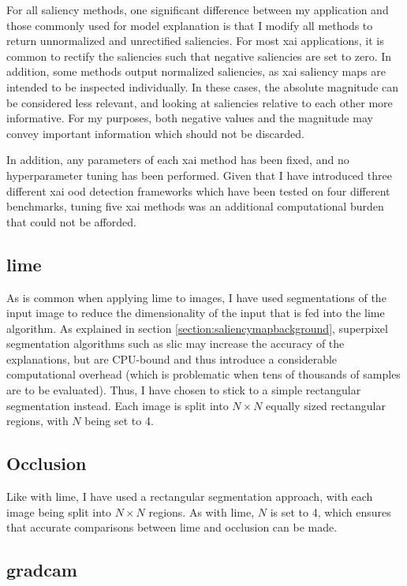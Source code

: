 \documentclass[UKenglish]{uiomasterthesis} %
\theoremstyle{definition}
\begin{document}
For all saliency methods, one significant difference between my application and those commonly used for model explanation is that I modify all methods to return unnormalized and unrectified saliencies. For most \ac{xai} applications, it is common to rectify the saliencies such that negative saliencies are set to zero. In addition, some methods output normalized saliencies, as \ac{xai} saliency maps are intended to be inspected individually. In these cases, the absolute magnitude can be considered less relevant, and looking at saliencies relative to each other more informative. For my purposes, both negative values and the magnitude may convey important information which should not be discarded.

In addition, any parameters of each \ac{xai} method has been fixed, and no hyperparameter tuning has been performed. Given that I have introduced three different \ac{xai} \ac{ood} detection frameworks which have been tested on four different benchmarks, tuning five \ac{xai} methods was an additional computational burden that could not be afforded.

\subsection{\ac{lime}}

As is common when applying \ac{lime} to images, I have used segmentations of the input image to reduce the dimensionality of the input that is fed into the \ac{lime} algorithm. As explained in section \ref{section:saliencymapbackground}, superpixel segmentation algorithms such as \ac{slic} may increase the accuracy of the explanations, but are CPU-bound and thus introduce a considerable computational overhead (which is problematic when tens of thousands of samples are to be evaluated). Thus, I have chosen to stick to a simple rectangular segmentation instead. Each image is split into $N \times N$ equally sized rectangular regions, with $N$ being set to 4.

\subsection{Occlusion}

Like with \ac{lime}, I have used a rectangular segmentation approach, with each image being split into $N \times N$ regions. As with \ac{lime}, $N$ is set to 4, which ensures that accurate comparisons between \ac{lime} and occlusion can be made.

\subsection{\ac{gradcam}}
\end{document}
